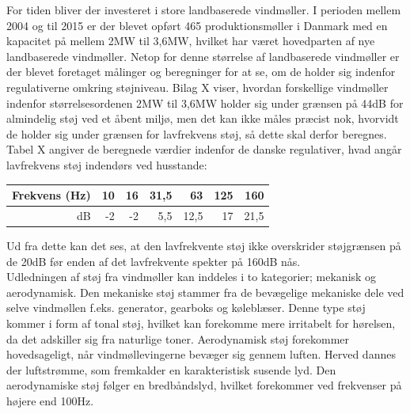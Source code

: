 For tiden bliver der investeret i store landbaserede vindmøller. I perioden mellem 2004 og til 2015 er der blevet opført 465 produktionsmøller i Danmark med en kapacitet på mellem 2MW til 3,6MW, hvilket har været hovedparten af nye landbaserede vindmøller. %
Netop for denne størrelse af landbaserede vindmøller er der blevet foretaget målinger og beregninger for at se, om de holder sig indenfor regulativerne omkring støjniveau. Bilag X %
viser, hvordan forskellige vindmøller indenfor størrelsesordenen 2MW til 3,6MW holder sig under grænsen på 44dB for almindelig støj ved et åbent miljø, men det kan ikke måles præcist nok, hvorvidt de holder sig under grænsen for lavfrekvens støj, så dette skal derfor beregnes. Tabel X angiver de beregnede værdier indenfor de danske regulativer, hvad angår lavfrekvens støj indendørs ved husstande: \\
\begin{table}[H]
\centering
\begin{tabular}{|r|r|r|r|r|r|r|} \hline
Frekvens (Hz) & 10 & 16 & 31,5 & 63 & 125 & 160 \\ \hline
dB & -2 & -2 & 5,5 & 12,5 & 17 & 21,5 \\ \hline
\end{tabular}
\end{table}

Ud fra dette kan det ses, at den lavfrekvente støj ikke overskrider støjgrænsen på de 20dB før enden af det lavfrekvente spekter på 160dB nås. %
\\
Udledningen af støj fra vindmøller kan inddeles i to kategorier; mekanisk og aerodynamisk. Den mekaniske støj stammer fra de bevægelige mekaniske dele ved selve vindmøllen f.eks. generator, gearboks og køleblæser. Denne type støj kommer i form af tonal støj, hvilket kan forekomme mere irritabelt for hørelsen, da det adskiller sig fra naturlige toner. Aerodynamisk støj forekommer hovedsageligt, når vindmøllevingerne bevæger sig gennem luften. Herved dannes der luftstrømme, som fremkalder en karakteristisk susende lyd. Den aerodynamiske støj følger en bredbåndslyd, hvilket forekommer ved frekvenser på højere end 100Hz. %
